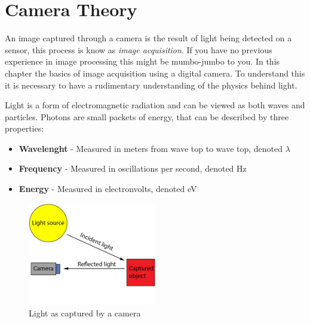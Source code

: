 \section{Camera Theory}

An image captured through a camera is the result of light being detected on a sensor, this process is know as \textit{image acquisition}. If you have no previous experience in image processing this might be mumbo-jumbo to you. In this chapter the basics of image acquisition using a digital camera. To understand this it is necessary to have a rudimentary understanding of the physics behind light.

Light is a form of electromagnetic radiation and can be viewed as both waves and particles. Photons are small packets of energy, that can be described by three properties:

\begin{itemize}
\item \textbf{Wavelenght} - Measured in meters from wave top to wave top, denoted $\lambda$
\item \textbf{Frequency} - Measured in oscillations per second, denoted Hz
\item \textbf{Energy} - Measured in electronvolts, denoted eV
\end{itemize}

\begin{figure}[htbp] 
\centering 
\includegraphics[width=0.5\textwidth]{Pictures/Theory/light_from_sun.png} 
\caption{Light as captured by a camera} 
\label{fig:light_cam} 
\end{figure} 


